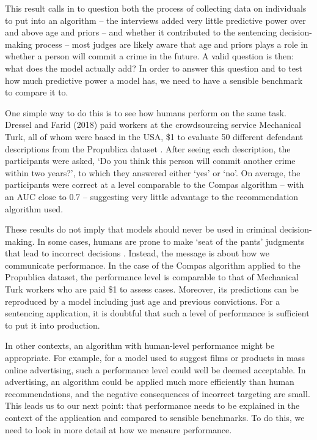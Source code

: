 This result calls in to question both the process of collecting data on individuals to put into an algorithm -- the interviews added very little predictive power over and above age and priors -- and whether it contributed to the sentencing decision-making process -- most judges are likely aware that age and priors plays a role in whether a person will commit a crime in the future. A valid question is then: what does the model actually add? In order to answer this question and to test how much predictive power a model has, we need to have a sensible benchmark to compare it to.

\enlargethispage{1em}

One simple way to do this is to see how humans perform on the same task. Dressel and Farid (2018) paid workers at the crowdsourcing service Mechanical Turk, all of whom were based in the USA, \$1 to evaluate 50 different defendant descriptions from the Propublica dataset \parencite{dressel2018accuracy}. After seeing each description, the participants were asked, `Do you think this person will commit another crime within two years?', to which they answered either `yes' or `no'. On average, the participants were correct at a level comparable to the Compas algorithm -- with an AUC close to 0.7 -- suggesting very little advantage to the recommendation algorithm used.

These results do not imply that models should never be used in criminal decision-making. In some cases, humans are prone to make `seat of the pants' judgments that lead to incorrect decisions \parencite{holsinger2018rejoinder}. Instead, the message is about how we communicate performance. In the case of the Compas algorithm applied to the Propublica dataset, the performance level is comparable to that of Mechanical Turk workers who are paid \$1 to assess cases. Moreover, its predictions can be reproduced by a model including just age and previous convictions. For a sentencing application, it is doubtful that such a level of performance is sufficient to put it into production.

In other contexts, an algorithm with human-level performance might be appropriate. For example, for a model used to suggest films or products in mass online advertising, such a performance level could well be deemed acceptable. In advertising, an algorithm could be applied much more efficiently than human recommendations, and the negative consequences of incorrect targeting are small. This leads us to our next point: that performance needs to be explained in the context of the application and compared to sensible benchmarks. To do this, we need to look in more detail at how we measure performance.

